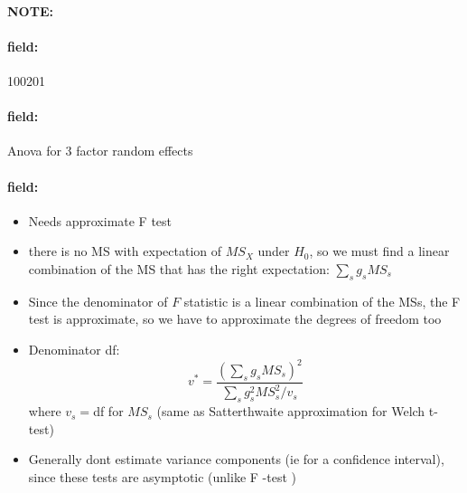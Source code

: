 \documentclass[12pt]{article}
\newenvironment{note}{\paragraph{NOTE:}}{}
\newenvironment{field}{\paragraph{field:}}{}
\begin{document}
\begin{note}
    \begin{field}
        \tiny 100201
    \end{field}
    \begin{field}
        Anova for 3 factor random effects
    \end{field}
    \begin{field}
        \begin{itemize}
          \item Needs approximate F test
          \item there is no MS with expectation of $MS_X$ under $H_0$, so we must find a linear combination of the MS that has the right expectation: $\sum_s g_s MS_s$
          \item Since the denominator of $F$ statistic is a linear combination of the MSs, the F test is approximate, so we have to approximate the degrees of freedom too
          \item Denominator df: $$ v^* = \frac{(\sum_sg_sMS_s)^2}{\sum_sg_s^2 MS_s^2/v_s}$$
          where $v_s = $df for $MS_s$ (same as Satterthwaite approximation for Welch t-test)
          \item Generally dont estimate variance components (ie for a confidence interval), since these tests are asymptotic (unlike F -test )
        \end{itemize}
    \end{field}
\end{note}
\end{document}
